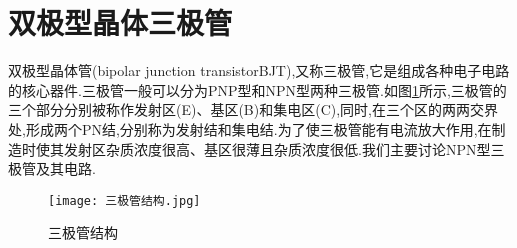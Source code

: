 \section{\K 双极型晶体三极管}
\Par 双极型晶体管(bipolar junction transistorBJT),又称三极管,它是组成各种电子电路的核心器件.三极管一般可以分为PNP型和NPN型两种三极管.如图\ref{fig:三极管结构}所示,三极管的三个部分分别被称作发射区(E)、基区(B)和集电区(C),同时,在三个区的两两交界处,形成两个PN结,分别称为发射结和集电结.为了使三极管能有电流放大作用,在制造时使其发射区杂质浓度很高、基区很薄且杂质浓度很低.我们主要讨论NPN型三极管及其电路.

\begin{figure}[htbp]
	\centering
	\texttt{[image: 三极管结构.jpg]}
	\caption{三极管结构}
	\label{fig:三极管结构}
\end{figure}

